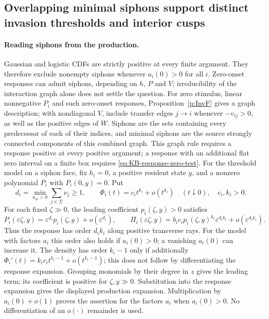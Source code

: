 \subsection{Overlapping minimal siphons support distinct invasion thresholds and interior cusps}

\paragraph{Reading siphons from the production.}
Gaussian and logistic CDFs are strictly positive at every finite argument.
They therefore exclude nonempty siphons whenever $a_i(0)>0$ for all $i$.
Zero-onset responses can admit siphons, depending on $h$, $P$ and $V$;
irreducibility of the interaction graph alone does not settle the question.
\eeR
{}
For zero stimulus, linear nonnegative $P_i$ and such zero-onset
responses, Proposition~\ref{p:InvF} gives a graph description;
with nondiagonal $V$, include transfer edges $j\to i$ whenever
$-v_{ij}>0$, as well as the positive edges of $W$. Siphons are the
sets containing every predecessor of each of their indices, and
minimal siphons are the source strongly connected components of
this combined graph. This graph rule requires a response positive
at every positive argument; a response with an additional flat zero
interval on a finite box requires \eqref{eq:KB-response-zero-test}.
\eeR
{}
For the threshold model on a siphon face, fix $h_i=0$, a positive resident state $y$,
and a nonzero polynomial $P_i$ with $P_i(0,y)=0$. Put
\[
 d_i=\min_{a_{i\nu}>0}\sum_{j\in \Sigma}\nu_j\ge1,\qquad
 \Phi_i(t)=c_it^{k_i}+o(t^{k_i})\quad(t\downarrow0),\quad c_i,k_i>0.
\]
For each fixed $\zeta\gg0$, the leading coefficient
$p_i(\zeta,y)>0$ satisfies
\[
 P_i(\varepsilon\zeta,y)=\varepsilon^{d_i}p_i(\zeta,y)
 +o(\varepsilon^{d_i}),\qquad
 \Pi_i(\varepsilon\zeta,y)
 =b_ic_ip_i(\zeta,y)^{k_i}\varepsilon^{d_ik_i}
 +o(\varepsilon^{d_ik_i}).
\]
Thus the response has order $d_ik_i$ along positive transverse rays.
For the model with factors $a_i$ this order also holds if $a_i(0)>0$;
a vanishing $a_i(0)$ can increase it.
The density has order $k_i-1$ only if additionally
$\Phi_i'(t)=k_ic_it^{k_i-1}+o(t^{k_i-1})$; this does not follow
by differentiating the response expansion.
Grouping monomials by their degree in $z$ gives the leading
term; its coefficient is positive for $\zeta,y\gg0$.
Substitution into the response expansion gives the displayed
production expansion. Multiplication by $a_i(0)+o(1)$ proves the
assertion for the factors $a_i$ when $a_i(0)>0$. No differentiation of an
$o(\cdot)$ remainder is used.
\eeR

